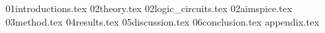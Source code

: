 \documentclass{article}
\begin{document}
\maketitle
\pagebreak
\tableofcontents

\pagebreak
{01introductions.tex}
\pagebreak
{02theory.tex}
\pagebreak
{02logic_circuits.tex}
\pagebreak
{02aimspice.tex}
\pagebreak
{03method.tex}
\pagebreak
{04results.tex}
\pagebreak
{05discussion.tex}
\pagebreak
{06conclusion.tex}
\pagebreak
{appendix.tex}
\pagebreak
\printbibliography
\end{document}
